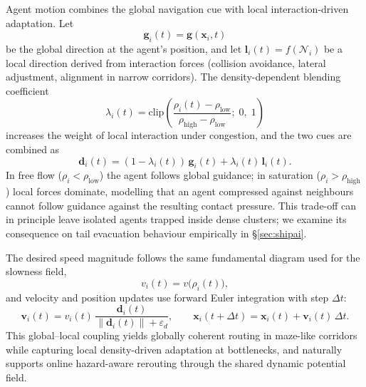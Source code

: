 \documentclass[preprint,12pt]{elsarticle}
\begin{document}
Agent motion combines the global navigation cue with local
interaction-driven adaptation. Let
\begin{equation}
\mathbf{g}_i(t) = \mathbf{g}(\mathbf{x}_i, t)
\label{eq:global_dir}
\end{equation}
be the global direction at the agent's position, and let
$\mathbf{l}_i(t) = f(\mathcal{N}_i)$ be a local direction derived from
interaction forces (collision avoidance, lateral adjustment, alignment
in narrow corridors). The density-dependent blending coefficient
\begin{equation}
\lambda_i(t) = \mathrm{clip}\!\left(
\frac{\rho_i(t) - \rho_{\mathrm{low}}}
     {\rho_{\mathrm{high}} - \rho_{\mathrm{low}}};\;
0,\; 1\right)
\label{eq:lambda_blend}
\end{equation}
increases the weight of local interaction under congestion, and the two
cues are combined as
\begin{equation}
\mathbf{d}_i(t) = (1 - \lambda_i(t))\, \mathbf{g}_i(t)
+ \lambda_i(t)\, \mathbf{l}_i(t).
\label{eq:blend_dir}
\end{equation}
In free flow ($\rho_i < \rho_{\mathrm{low}}$) the agent follows global
guidance; in saturation ($\rho_i > \rho_{\mathrm{high}}$) local forces
dominate, modelling that an agent compressed against neighbours cannot
follow guidance against the resulting contact pressure. This trade-off
can in principle leave isolated agents trapped inside dense clusters; we
examine its consequence on tail evacuation behaviour empirically in
\S\ref{sec:shipai}.

The desired speed magnitude follows the same fundamental diagram used
for the slowness field,
\begin{equation}
v_i(t) = v\!\big(\rho_i(t)\big),
\label{eq:desired_speed}
\end{equation}
and velocity and position updates use forward Euler integration with
step $\Delta t$:
\begin{equation}
\mathbf{v}_i(t) = v_i(t)\,
\frac{\mathbf{d}_i(t)}{\|\mathbf{d}_i(t)\| + \varepsilon_d},
\qquad
\mathbf{x}_i(t + \Delta t) = \mathbf{x}_i(t) + \mathbf{v}_i(t)\, \Delta t.
\label{eq:state_update}
\end{equation}
This global--local coupling yields globally coherent routing in
maze-like corridors while capturing local density-driven adaptation at
bottlenecks, and naturally supports online hazard-aware rerouting
through the shared dynamic potential field.

\end{document}
